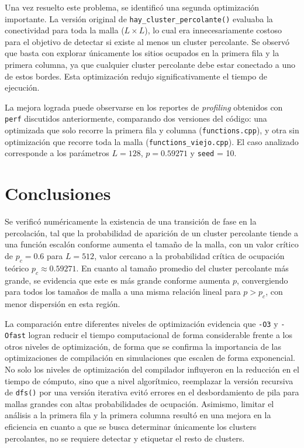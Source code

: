 \documentclass[%
 reprint,
 amsmath,amssymb,
 aps,
]{revtex4-2}
\begin{document}
Una vez resuelto este problema, se identificó una segunda optimización importante. La versión original de \texttt{hay\_cluster\_percolante()} evaluaba la conectividad para toda la malla (\( L \times L \)), lo cual era innecesariamente costoso para el objetivo de detectar si existe al menos un cluster percolante. Se observó que basta con explorar únicamente los sitios ocupados en la primera fila y la primera columna, ya que cualquier cluster percolante debe estar conectado a uno de estos bordes. Esta optimización redujo significativamente el tiempo de ejecución.

La mejora lograda puede observarse en los reportes de \textit{profiling} obtenidos con \texttt{perf} discutidos anteriormente, comparando dos versiones del código: una optimizada que solo recorre la primera fila y columna (\texttt{functions.cpp}), y otra sin optimización que recorre toda la malla (\texttt{functions\_viejo.cpp}). El caso analizado corresponde a los parámetros \( L = 128 \), \( p = 0.59271 \) y \texttt{seed} = 10.


\section{Conclusiones}

Se verificó numéricamente la existencia de una transición de fase en la percolación, tal que la probabilidad de aparición de un cluster percolante tiende a una función escalón conforme aumenta el tamaño de la malla, con un valor crítico de $p_c = 0.6$ para $L = 512$, valor cercano a la probabilidad crítica de ocupación teórico $p_c \approx 0.59271$. En cuanto al tamaño promedio del cluster percolante más grande, se evidencia que este es más grande conforme aumenta $p$, convergiendo para todos los tamaños de malla a una misma relación lineal para $p > p_c$, con menor dispersión en esta región.
\vspace{0.2 cm}

La comparación entre diferentes niveles de optimización evidencia que \texttt{-O3} y \texttt{-Ofast} logran reducir el tiempo computacional de forma considerable frente a los otros niveles de optimización, de forma que se confirma la importancia de las optimizaciones de compilación en simulaciones que escalen de forma exponencial. No solo los niveles de optimización del compilador influyeron en la reducción en el tiempo de cómputo, sino que a nivel algorítmico, reemplazar la versión recursiva de \texttt{dfs()} por una versión iterativa evitó errores en el desbordamiento de pila para mallas grandes con altas probabilidades de ocupación. Asimismo, limitar el análisis a la primera fila y la primera columna resultó en una mejora en la eficiencia en cuanto a que se busca determinar únicamente los clusters percolantes, no se requiere detectar y etiquetar el resto de clusters.
\vspace{0.2 cm}
\end{document}
